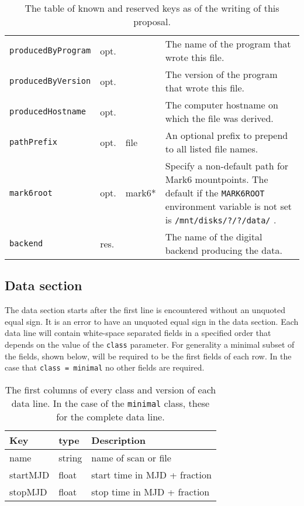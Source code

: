 \documentclass[12pt]{article}
\begin{document}
\begin{table}[h]
\begin{tabularx}{\textwidth}{lllX}
{\tt producedByProgram} & opt.  &        & The name of the program that wrote this file. \\
{\tt producedByVersion} & opt.  &        & The version of the program that wrote this file. \\
{\tt producedHostname}  & opt.  &        & The computer hostname on which the file was derived. \\
{\tt pathPrefix}        & opt.  & file   & An optional prefix to prepend to all listed file names. \\
{\tt mark6root}         & opt.  & mark6* & Specify a non-default path for Mark6 mountpoints.  The default if the {\tt MARK6ROOT} environment variable is not set is {\tt /mnt/disks/?/?/data/} . \\
{\tt backend}           & res.  &        & The name of the digital backend producing the data. \\
\hline
\hline
\end{tabularx}
\caption{\label{tab:keys}
The table of known and reserved keys as of the writing of this proposal.
}
\end{table}


\subsection{Data section} \label{sec:data}

The data section starts after the first line is encountered without an unquoted equal sign.
It is an error to have an unquoted equal sign in the data section.
Each data line will contain white-space separated fields in a specified order that depends on the value of the {\tt class} parameter.
For generality a minimal subset of the fields, shown below, will be required to be the first fields of each row.
In the case that {\tt class = minimal} no other fields are required.

\begin{table}[h]
\begin{tabularx}{\textwidth}{llX}
\hline
Key & type & Description \\
\hline
name & string & name of scan or file \\
startMJD & float & start time in MJD + fraction \\
stopMJD & float & stop time in MJD + fraction \\
\hline
\hline
\end{tabularx}
\caption{\label{tab:minimaldata}
The first columns of every class and version of each data line.  In the case of the {\tt minimal} class, these for the complete data line.
}
\end{table}
\end{document}
